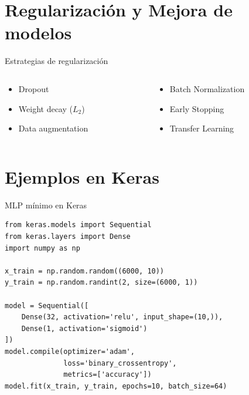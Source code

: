 \documentclass[8pt,spanish]{beamer}
\begin{document}
\section{Regularización y Mejora de modelos}
\begin{frame}{Estrategias de regularización}
  \begin{columns}
    \begin{column}{0.5\textwidth}
      \begin{itemize}
        \item Dropout
        \item Weight decay ($L_2$)
        \item Data augmentation
      \end{itemize}
    \end{column}
    \begin{column}{0.5\textwidth}
      \begin{itemize}
        \item Batch Normalization
        \item Early Stopping
        \item Transfer Learning
      \end{itemize}
    \end{column}
  \end{columns}
\end{frame}

\section{Ejemplos en Keras}
\begin{frame}[fragile]{MLP mínimo en Keras}
  \begin{verbatim}
from keras.models import Sequential
from keras.layers import Dense
import numpy as np

x_train = np.random.random((6000, 10))
y_train = np.random.randint(2, size=(6000, 1))

model = Sequential([
    Dense(32, activation='relu', input_shape=(10,)),
    Dense(1, activation='sigmoid')
])
model.compile(optimizer='adam',
              loss='binary_crossentropy',
              metrics=['accuracy'])
model.fit(x_train, y_train, epochs=10, batch_size=64)
  \end{verbatim}
\end{frame}
\end{document}

